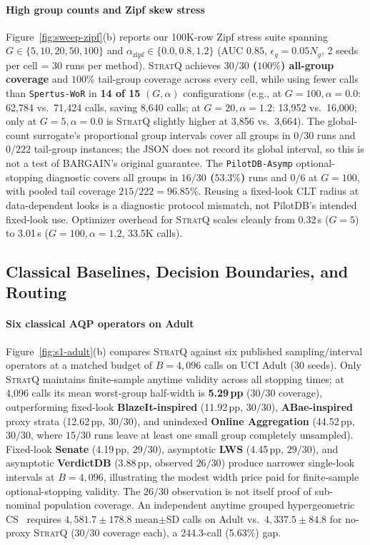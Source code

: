 \paragraph{High group counts and Zipf skew stress}
Figure~\ref{fig:sweep-zipf}(b) reports our 100K-row Zipf stress suite spanning $G \in \{5, 10, 20, 50, 100\}$ and $\alpha_{\text{zipf}} \in \{0.0, 0.8, 1.2\}$ (AUC $0.85$, $\epsilon_g = 0.05 N_g$, 2 seeds per cell = 30 runs per method).
\textsc{StratQ} achieves \textbf{$30/30$ ($100\%$) all-group coverage} and $100\%$ tail-group coverage across every cell, while using fewer calls than \texttt{Spertus-WoR} in \textbf{14 of 15} $(G, \alpha)$ configurations (e.g., at $G=100, \alpha=0.0$: 62,784 vs.\ 71,424 calls, saving 8,640 calls; at $G=20, \alpha=1.2$: 13,952 vs.\ 16,000; only at $G=5, \alpha=0.0$ is \textsc{StratQ} slightly higher at 3,856 vs.\ 3,664).
The global-count surrogate's proportional group intervals cover all groups in \textbf{$0/30$} runs and $0/222$ tail-group instances; the JSON does not record its global interval, so this is not a test of BARGAIN's original guarantee. The \texttt{PilotDB-Asymp} optional-stopping diagnostic covers all groups in \textbf{$16/30$ ($53.3\%$)} runs and $0/6$ at $G=100$, with pooled tail coverage $215/222=96.85\%$. Reusing a fixed-look CLT radius at data-dependent looks is a diagnostic protocol mismatch, not PilotDB's intended fixed-look use.
Optimizer overhead for \textsc{StratQ} scales cleanly from 0.32\,s ($G=5$) to 3.01\,s ($G=100, \alpha=1.2$, 33.5K calls).

\subsection{Classical Baselines, Decision Boundaries, and Routing}
\label{sec:eval-classical}

\paragraph{Six classical AQP operators on Adult}
Figure~\ref{fig:s1-adult}(b) compares \textsc{StratQ} against six published sampling/interval operators at a matched budget of $B=4{,}096$ calls on UCI Adult (30 seeds).
Only \textsc{StratQ} maintains finite-sample anytime validity across all stopping times; at 4,096 calls its mean worst-group half-width is \textbf{5.29\,pp} ($30/30$ coverage), outperforming fixed-look \textbf{BlazeIt-inspired} (11.92\,pp, $30/30$), \textbf{ABae-inspired} proxy strata (12.62\,pp, $30/30$), and unindexed \textbf{Online Aggregation} (44.52\,pp, $30/30$, where $15/30$ runs leave at least one small group completely unsampled).
Fixed-look \textbf{Senate} (4.19\,pp, $29/30$), asymptotic \textbf{LWS} (4.45\,pp, $29/30$), and asymptotic \textbf{VerdictDB} (3.88\,pp, observed $26/30$) produce narrower single-look intervals at $B=4{,}096$, illustrating the modest width price paid for finite-sample optional-stopping validity. The $26/30$ observation is not itself proof of sub-nominal population coverage.
An independent anytime grouped hypergeometric CS~\cite{wor2020} requires $4{,}581.7\pm178.8$ mean$\pm$SD calls on Adult vs.\ $4{,}337.5\pm84.8$ for no-proxy \textsc{StratQ} ($30/30$ coverage each), a 244.3-call (5.63\%) gap.

